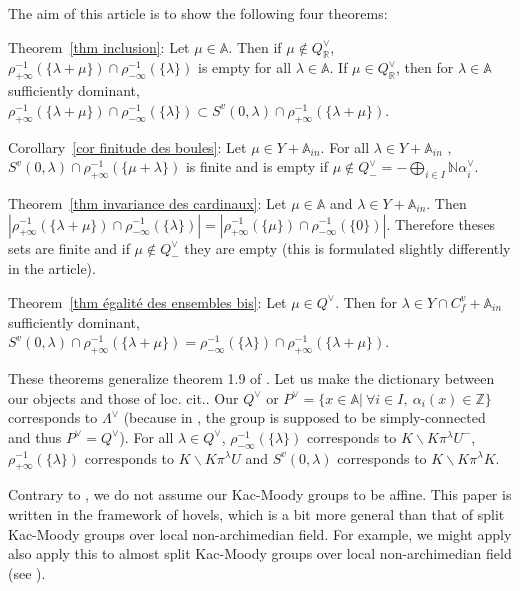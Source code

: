 \documentclass[12pt]{article}
\theoremstyle{plain}
\theoremstyle{definition}
\newcommand{\R}{\mathbb{R}}
\newcommand{\A}{\mathbb{A}}
\newcommand{\N}{\mathbb{N}}
\newcommand{\Z}{\mathbb{Z}}
\begin{document}
\vspace{3mm}
 The aim of this article is to show the following four theorems: 
\vspace{3mm}

Theorem~\ref{thm inclusion}:
Let $\mu\in \A$. Then if $\mu\notin Q_{\R}^\vee$, $\rho_{+\infty}^{-1}(\{\lambda+\mu\})\cap \rho_{-\infty}^{-1}(\{\lambda\})$ is empty for all $\lambda\in \A$. If $\mu\in Q^\vee_{\R}$, then for $\lambda\in \A$ sufficiently dominant, $\rho_{+\infty}^{-1}(\{\lambda+\mu\})\cap \rho_{-\infty}^{-1}(\{\lambda\})\subset S^v(0,\lambda)\cap \rho_{+\infty}^{-1}(\{\lambda+\mu\}) $. 

\vspace{3mm}
Corollary~\ref{cor finitude des boules}:
 Let $\mu\in Y+\A_{in}$. For all $\lambda\in Y+\A_{in}$ , $S^v(0,\lambda)\cap \rho_{+\infty}^{-1}(\{\mu+\lambda\})$ is finite and is empty if $\mu\notin Q^\vee_-=-\bigoplus _{i\in I}\N\alpha_i^\vee$.

\vspace{3mm}
Theorem~\ref{thm invariance des cardinaux}: 
Let $\mu\in \A$ and $\lambda\in Y+\A_{in}$. Then $|\rho_{+\infty}^{-1}(\{\lambda+\mu\})\cap\rho_{-\infty}^{-1}(\{\lambda\})|=|\rho_{+\infty}^{-1}(\{\mu\})\cap\rho_{-\infty}^{-1}(\{0\})|$. Therefore theses sets are finite and if $\mu\notin Q^\vee_-$ they are empty (this is formulated slightly differently in the article).

\vspace{3mm}
Theorem~\ref{thm égalité des ensembles bis}:
 Let $\mu\in Q^\vee$. Then for $\lambda\in Y\cap C^v_f+\A_{in}$ sufficiently dominant, $S^v(0,\lambda)\cap \rho_{+\infty}^{-1}(\{\lambda+\mu\})=\rho_{-\infty}^{-1}(\{\lambda\})\cap\rho_{+\infty}^{-1}(\{\lambda+\mu\})$.
\vspace{3mm}

These theorems generalize theorem 1.9 of \cite{braverman2014affine}. Let us make the dictionary between our objects and those of loc. cit.. Our $Q^\vee$ or $P^\vee=\{x\in \A|\ \forall i\in I,\ \alpha_i(x)\in\Z\}$ corresponds to $\Lambda^\vee$ (because in \cite{braverman2014affine}, the group is supposed to be simply-connected and thus $P^\vee=Q^\vee$). For all $\lambda\in Q^\vee$, $\rho_{-\infty}^{-1}(\{\lambda\})$ corresponds to $K\backslash K \pi^\lambda U^{-}$, $\rho_{+\infty}^{-1}(\{\lambda\})$ corresponds to $K\backslash K\pi^\lambda U$ and $S^v(0,\lambda)$ corresponds to  $K\backslash K\pi^\lambda K$. 

Contrary to \cite{braverman2014affine}, we do not assume our Kac-Moody groups to be affine. This paper is written in the framework of hovels, which is a bit more general than that of split Kac-Moody groups over local non-archimedian field. For example, we might apply also apply this to almost split Kac-Moody groups over local non-archimedian field (see \cite{rousseau2012almost}).
\end{document}
